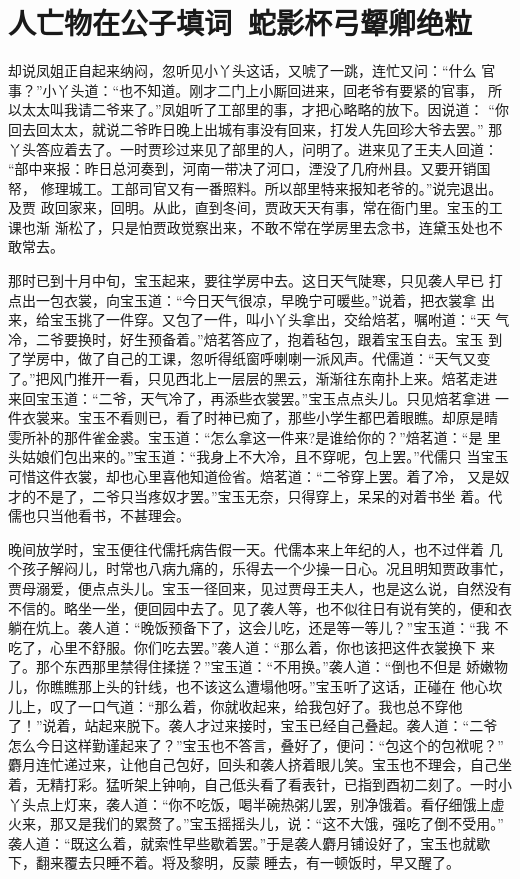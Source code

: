\chapter{人亡物在公子填词~蛇影杯弓颦卿绝粒}

却说凤姐正自起来纳闷，忽听见小丫头这话，又唬了一跳，连忙又问：“什么
官事？”小丫头道：“也不知道。刚才二门上小厮回进来，回老爷有要紧的官事，
所以太太叫我请二爷来了。”凤姐听了工部里的事，才把心略略的放下。因说道：
“你回去回太太，就说二爷昨日晚上出城有事没有回来，打发人先回珍大爷去罢。”
那丫头答应着去了。一时贾珍过来见了部里的人，问明了。进来见了王夫人回道：
“部中来报：昨日总河奏到，河南一带决了河口，湮没了几府州县。又要开销国帑，
修理城工。工部司官又有一番照料。所以部里特来报知老爷的。”说完退出。及贾
政回家来，回明。从此，直到冬间，贾政天天有事，常在衙门里。宝玉的工课也渐
渐松了，只是怕贾政觉察出来，不敢不常在学房里去念书，连黛玉处也不敢常去。

那时已到十月中旬，宝玉起来，要往学房中去。这日天气陡寒，只见袭人早已
打点出一包衣裳，向宝玉道：“今日天气很凉，早晚宁可暖些。”说着，把衣裳拿
出来，给宝玉挑了一件穿。又包了一件，叫小丫头拿出，交给焙茗，嘱咐道：“天
气冷，二爷要换时，好生预备着。”焙茗答应了，抱着毡包，跟着宝玉自去。宝玉
到了学房中，做了自己的工课，忽听得纸窗呼喇喇一派风声。代儒道：“天气又变
了。”把风门推开一看，只见西北上一层层的黑云，渐渐往东南扑上来。焙茗走进
来回宝玉道：“二爷，天气冷了，再添些衣裳罢。”宝玉点点头儿。只见焙茗拿进
一件衣裳来。宝玉不看则已，看了时神已痴了，那些小学生都巴着眼瞧。却原是晴
雯所补的那件雀金裘。宝玉道：“怎么拿这一件来?是谁给你的？”焙茗道：“是
里头姑娘们包出来的。”宝玉道：“我身上不大冷，且不穿呢，包上罢。”代儒只
当宝玉可惜这件衣裳，却也心里喜他知道俭省。焙茗道：“二爷穿上罢。着了冷，
又是奴才的不是了，二爷只当疼奴才罢。”宝玉无奈，只得穿上，呆呆的对着书坐
着。代儒也只当他看书，不甚理会。

晚间放学时，宝玉便往代儒托病告假一天。代儒本来上年纪的人，也不过伴着
几个孩子解闷儿，时常也八病九痛的，乐得去一个少操一日心。况且明知贾政事忙，
贾母溺爱，便点点头儿。宝玉一径回来，见过贾母王夫人，也是这么说，自然没有
不信的。略坐一坐，便回园中去了。见了袭人等，也不似往日有说有笑的，便和衣
躺在炕上。袭人道：“晚饭预备下了，这会儿吃，还是等一等儿？”宝玉道：“我
不吃了，心里不舒服。你们吃去罢。”袭人道：“那么着，你也该把这件衣裳换下
来了。那个东西那里禁得住揉搓？”宝玉道：“不用换。”袭人道：“倒也不但是
娇嫩物儿，你瞧瞧那上头的针线，也不该这么遭塌他呀。”宝玉听了这话，正碰在
他心坎儿上，叹了一口气道：“那么着，你就收起来，给我包好了。我也总不穿他
了！”说着，站起来脱下。袭人才过来接时，宝玉已经自己叠起。袭人道：“二爷
怎么今日这样勤谨起来了？”宝玉也不答言，叠好了，便问：“包这个的包袱呢？”
麝月连忙递过来，让他自己包好，回头和袭人挤着眼儿笑。宝玉也不理会，自己坐
着，无精打彩。猛听架上钟响，自己低头看了看表针，已指到酉初二刻了。一时小
丫头点上灯来，袭人道：“你不吃饭，喝半碗热粥儿罢，别净饿着。看仔细饿上虚
火来，那又是我们的累赘了。”宝玉摇摇头儿，说：“这不大饿，强吃了倒不受用。”
袭人道：“既这么着，就索性早些歇着罢。”于是袭人麝月铺设好了，宝玉也就歇
下，翻来覆去只睡不着。将及黎明，反蒙睡去，有一顿饭时，早又醒了。

